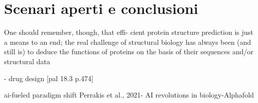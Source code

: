 \chapter{Scenari aperti e conclusioni}

One should remember, though, that effi-
cient protein structure prediction is just a means to an end; the real challenge of structural
biology has always been (and still is) to deduce the functions of proteins on the basis of their
sequences and/or structural data\supercite{kessel}


- drug design [pal 18.3 p.474]


ai-fueled paradigm shift
Perrakis et al., 2021- AI revolutions in biology-Alphafold